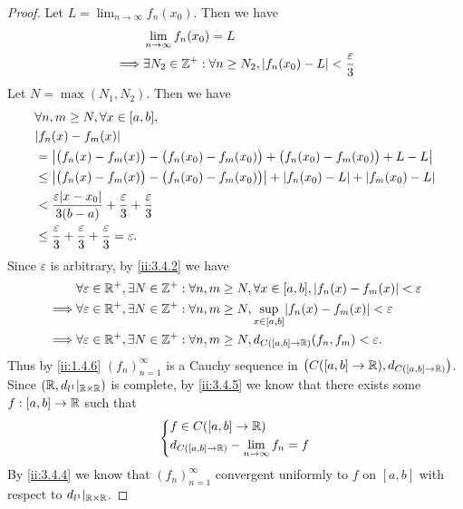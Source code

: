 \begin{proof}
  Let \(L = \lim_{n \to \infty} f_n(x_0)\).
  Then we have
  \begin{align*}
             & \lim_{n \to \infty} f_n(x_0) = L                                                       \\
    \implies & \exists N_2 \in \mathbb{Z}^+ : \forall n \geq N_2, \left\lvert f_n(x_0) - L\right\rvert < \dfrac{\varepsilon}{3}
  \end{align*}
  Let \(N = \max(N_1, N_2)\).
  Then we have
  \begin{align*}
     & \forall n, m \geq N, \forall x \in [a, b],                                                                     \\
     & \abs{f_n(x) - f_m(x)}                                                                                          \\
     & = \abs{\big(f_n(x) - f_m(x)\big) - \big(f_n(x_0) - f_m(x_0)\big) + \big(f_n(x_0) - f_m(x_0)\big) + L - L}      \\
     & \leq \abs{\big(f_n(x) - f_m(x)\big) - \big(f_n(x_0) - f_m(x_0)\big)} + \abs{f_n(x_0) - L} + \abs{f_m(x_0) - L} \\
     & < \dfrac{\varepsilon \abs{x - x_0}}{3(b - a)} + \dfrac{\varepsilon}{3} + \dfrac{\varepsilon}{3}                \\
     & \leq \dfrac{\varepsilon}{3} + \dfrac{\varepsilon}{3} + \dfrac{\varepsilon}{3} = \varepsilon.
  \end{align*}
  Since \(\varepsilon\) is arbitrary, by \cref{ii:3.4.2} we have
  \begin{align*}
             & \forall \varepsilon \in \R^+, \exists N \in \Z^+ : \forall n, m \geq N, \forall x \in [a, b], \abs{f_n(x) - f_m(x)} < \varepsilon \\
    \implies & \forall \varepsilon \in \R^+, \exists N \in \Z^+ : \forall n, m \geq N, \sup_{x \in [a, b]}\abs{f_n(x) - f_m(x)} < \varepsilon    \\
    \implies & \forall \varepsilon \in \R^+, \exists N \in \Z^+ : \forall n, m \geq N, d_{C([a, b] \to \R)}(f_n, f_m) < \varepsilon.
  \end{align*}
  Thus by \cref{ii:1.4.6} \((f_n)_{n = 1}^\infty\) is a Cauchy sequence in \(\big(C([a, b] \to \mathbb{R}), d_{C([a, b] \to \mathbb{R})}\big)\).
  Since \((\mathbb{R}, d_{l^1}|_{\mathbb{R} \times \mathbb{R}})\) is complete, by \cref{ii:3.4.5} we know that there exists some \(f : [a, b] \to \mathbb{R}\) such that
  \[
    \begin{dcases}
      f \in C([a, b] \to \mathbb{R}) \\
      d_{C([a, b] \to \mathbb{R})} - \lim_{n \to \infty} f_n = f
    \end{dcases}
  \]
  By \cref{ii:3.4.4} we know that \((f_n)_{n = 1}^\infty\) convergent uniformly to \(f\) on \([a, b]\) with respect to \(d_{l^1}|_{\mathbb{R} \times \mathbb{R}}\).


\end{proof}
